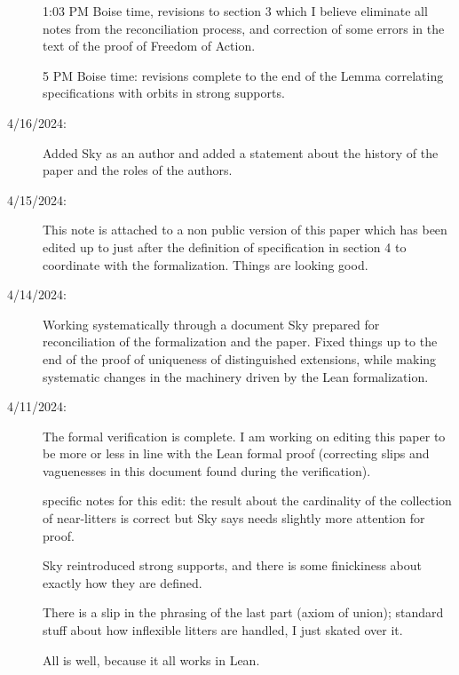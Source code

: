 \documentclass[112pt]{article}
\begin{document}
\begin{description}
1:03 PM Boise time, revisions to section 3 which I believe eliminate all notes from the reconciliation process, and correction of some errors in the text of the proof of Freedom of Action.

5 PM Boise time:  revisions complete to the end of the Lemma correlating specifications with orbits in strong supports.


\item[4/16/2024:]  Added Sky as an author and added a statement about the history of the paper and the roles of the authors.

\item[4/15/2024:]  This note is attached to a non public version of this paper which has been edited up to just after the definition of specification in section 4 to coordinate with the formalization.  Things are looking good.

\item[4/14/2024:]  Working systematically through a document Sky prepared for reconciliation of the formalization and the paper.  Fixed things up to the end of the proof of uniqueness of distinguished extensions, while making systematic changes in the machinery driven by the Lean formalization.

\item[4/11/2024:]  The formal verification is complete.  I am working on editing this paper to be more or less in line with the Lean formal proof (correcting slips and vaguenesses in this document found during the verification).

specific notes for this edit:  the result about the cardinality of the collection of near-litters is correct but Sky says needs slightly more attention for proof.  

Sky reintroduced strong supports, and there is some finickiness about exactly how they are defined.

There is a slip in the phrasing of the last part (axiom of union);  standard stuff about how inflexible litters are handled, I just skated over it.

All is well, because it all works in Lean.













\end{description}

\end{document}
